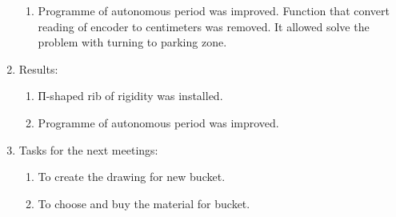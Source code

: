 \begin{enumerate}
\begin{enumerate}
	  \item Programme of autonomous period was improved. Function that convert reading of encoder to centimeters was removed. It allowed solve the problem with turning to parking zone.	  
	  
    \end{enumerate}
    
	\item Results:  
	\begin{enumerate}
	  \item П-shaped rib of rigidity was installed.
	  
	  \item Programme of autonomous period was improved.
	  
    \end{enumerate}
    
	\item Tasks for the next meetings:
	\begin{enumerate}
	  \item To create the drawing for new bucket.
	  
	  \item To choose and buy the material for bucket.
	  
    \end{enumerate}     
\end{enumerate}
\fillpage